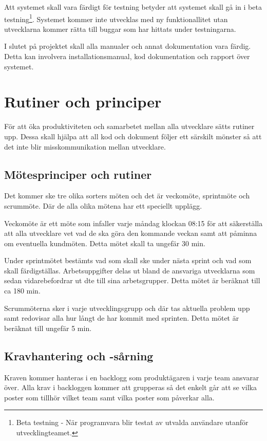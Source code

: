 \documentclass[a4paper,12pt,oneside,final]{extbook}
\begin{document}
 Att systemet skall vara färdigt för testning betyder att systemet skall gå in i beta testning\footnote{Beta testning - När programvara blir testat av utvalda användare utanför utvecklingteamet.}. Systemet kommer inte utvecklas med ny funktionallitet utan utvecklarna kommer rätta till buggar som har hittats under testningarna. 
 
 I slutet på projektet skall alla manualer och annat dokumentation vara färdig. Detta kan involvera installationsmanual, kod dokumentation och rapport över systemet.


\chapter{Rutiner och principer}

För att öka produktiviteten och samarbetet mellan alla utvecklare sätts rutiner upp. Dessa skall hjälpa att all kod och dokument följer ett särskilt mönster så att det inte blir misskommunikation mellan utvecklare.

\section{Mötesprinciper och rutiner}

Det kommer ske tre olika sorters möten och det är veckomöte, sprintmöte och scrummöte. Där de alla olika mötena har ett speciellt upplägg.  

Veckomöte är ett möte som infaller varje måndag klockan 08:15 för att säkerställa att alla utvecklare vet vad de ska göra den kommande veckan samt att påminna om eventuella kundmöten. Detta mötet skall ta ungefär 30 min.

Under sprintmötet bestämts vad som skall ske under nästa sprint och vad som skall färdigställas. Arbetsuppgifter delas ut bland de ansvariga utvecklarna som sedan vidarebefordrar ut dte till sina arbetsgrupper. Detta mötet är beräknat till ca 180 min.

Scrummöterna sker i varje utvecklingsgrupp och där tas aktuella problem upp samt redovisar alla hur långt de har kommit med sprinten.  Detta mötet är beräknat till ungefär 5 min.

\section{Kravhantering och -sårning}
Kraven kommer hanteras i en backlogg som produktägaren i varje team ansvarar över. Alla krav i backloggen kommer att grupperas så det enkelt går att se vilka poster som tillhör vilket team samt vilka poster som påverkar alla. 
\end{document}
